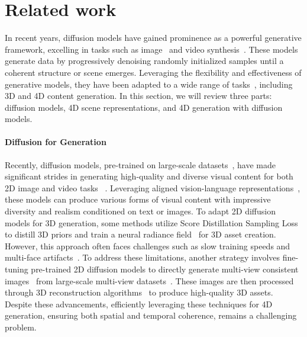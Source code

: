 \section{Related work}

In recent years, diffusion models have gained prominence as a powerful generative framework, excelling in tasks such as image~\citep{rombach2022latentdiff,nichol2021improvedddpm,nichol2021glide,ramesh2022hierarchicaldiff} and video synthesis~\citep{blattmann2023alignlatentvd,an2023latentshiftvd,ge2023preservecovd,guo2023animatediffvd,singer2022makeavideovd}. These models generate data by progressively denoising randomly initialized samples until a coherent structure or scene emerges. Leveraging the flexibility and effectiveness of generative models, they have been adapted to a wide range of tasks~\cite{zheng2023ddcot, tang2023cotdet, shi2024part2object, tang2023temporal, tang2023contrastive}, including 3D and 4D content generation. 
In this section, we will review three parts: diffusion models, 4D scene representations, and 4D generation with diffusion models.


\paragraph{Diffusion for Generation}
Recently, diffusion models, pre-trained on large-scale datasets~\citep{schuhmann2022laion}, have made significant strides in generating high-quality and diverse visual content for both 2D image and video tasks ~\citep{rombach2022latentdiff,nichol2021improvedddpm,blattmann2023alignlatentvd,an2023latentshiftvd,huang2024free}. Leveraging aligned vision-language representations~\cite{shi2024plain, dai2024curriculum, shi2024devil, shi2023logoprompt, shi2023edadet, shi2022spatial}, these models can produce various forms of visual content with impressive diversity and realism conditioned on text or images. To adapt 2D diffusion models for 3D generation, some methods utilize Score Distillation Sampling Loss~\citep{poole2022dreamfusion,lin2023magic3d,chen2023fantasia3d,wang2024prolificdreamer} to distill 3D priors and train a neural radiance field~\citep{mildenhall2020nerf} for 3D asset creation. However, this approach often faces challenges such as slow training speeds and multi-face artifacts~\citep{shi2023mvdream}. To address these limitations, another strategy involves fine-tuning pre-trained 2D diffusion models to directly generate multi-view consistent images~\citep{shi2023mvdream,liu2023zero123,long2024wonder3d,liu2023syncdreamer,li2024era3d} from large-scale multi-view datasets~\citep{deitke2023objaverse}. These images are then processed through 3D reconstruction algorithms~\citep{wang2021neus,kerbl20233dgs,liu2023nero} to produce high-quality 3D assets. Despite these advancements, efficiently leveraging these techniques for 4D generation, ensuring both spatial and temporal coherence, remains a challenging problem.


